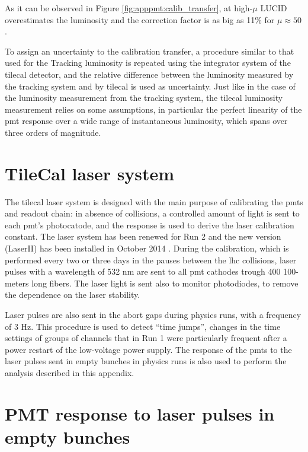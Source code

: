 As it can be observed in Figure \ref{fig:apppmt:calib_transfer}, at high-$\mu$ LUCID overestimates the luminosity and 
the correction factor is as big as 11\% for $\mu \approx 50$. 

To assign an uncertainty to the calibration transfer, a 
procedure similar to that used for the Tracking luminosity 
is repeated using the 
integrator system of the \gls{tilecal} detector, and the relative difference between the luminosity measured by the tracking system and 
by \gls{tilecal}  is used as uncertainty. 
Just like in the case of the luminosity measurement from the tracking system, the \gls{tilecal} luminosity measurement 
relies on some assumptions, in particular the perfect linearity of the \gls{pmt} response over a wide range of instantaneous luminosity, 
which spans over three orders of magnitude. 


\section{TileCal laser system}
\label{sec:app:laser}

The \gls{tilecal} laser system \cite{system:2016tae} is designed with the main purpose of calibrating the \glspl{pmt} and readout chain: 
in absence of collisions, a controlled amount of light is sent to each \gls{pmt}'s photocatode, 
and the response is used to derive the laser calibration constant. 
The laser system has been renewed for Run 2 and the new version (LaserII)
has been installed in October 2014 \cite{Scuri:2016ctn-2}. 
During the calibration, which is performed every two or three days in the 
pauses between the \gls{lhc} collisions,
laser pulses with a wavelength of 532 nm are sent to all \gls{pmt} cathodes 
trough 400 100-meters long fibers. 
The laser light is sent also to monitor photodiodes, to remove the dependence on the laser stability. 

Laser pulses are also sent in the abort gaps during physics runs, with a frequency of 
3 Hz. 
This procedure is used to detect ``time jumps'', changes in the time settings of groups of channels 
that in Run 1 were particularly frequent after a power restart of the low-voltage power
supply.
The response of the \glspl{pmt} to the laser pulses sent in empty bunches in physics runs 
is also used to perform the analysis described in this appendix. 


\section{PMT response to laser pulses in empty bunches}
\label{sec:app:pmtresponse}

